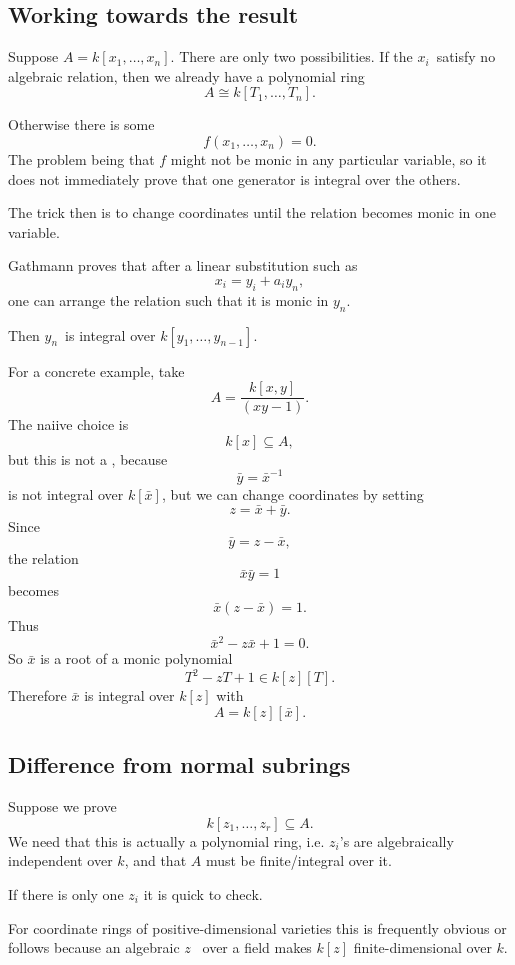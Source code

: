 \documentclass[11pt]{article}
\begin{document}
\subsection{Working towards the result}

Suppose $A = k[x_1,\ldots,x_n]$. There are only 
two possibilities. If the $x_i$ satisfy no 
algebraic relation, then we already have a polynomial ring 
\[
    A \cong k[T_1,\ldots,T_n]. 
\]

Otherwise there is some 
\[
    f(x_1,\ldots,x_n) = 0. 
\]
The problem being that $f$ might not be monic in 
any particular variable, so it does not immediately 
prove that one generator is integral over the others. 

The trick then is to change coordinates until the 
relation becomes monic in one variable. 

Gathmann proves that after a linear substitution such as 
\[
    x_i = y_i + a_iy_n, 
\]
one can arrange the relation such that it is monic in $y_n$. 

Then $y_n$ is integral over $k[y_1,\ldots,y_{n-1}]$. 

For a concrete example, take 
\[
    A = \frac{k[x,y]}{(xy - 1)}.
\]
The naiive choice is 
\[
    k[x] \subseteq A, 
\]
but this is not a , because 
\[
    \bar y = \bar x^{-1}
\]
is not integral over $k[\bar x]$, 
but we can change coordinates by setting 
\[
    z = \bar x + \bar y. 
\]
Since 
\[
    \bar y = z - \bar x, 
\]
the relation 
\[
    \bar x \bar y = 1
\]
becomes 
\[
    \bar x(z - \bar x) = 1. 
\]
Thus 
\[
    \bar x^2 - z \bar x + 1 = 0. 
\]
So $\bar x$ is a root of a monic polynomial 
\[
    T^2 - zT + 1 \in k[z][T].
\]
Therefore $\bar x$ is integral over $k[z]$ with 
\[
    A = k[z][\bar x]. 
\]

\subsection{Difference from normal subrings}
Suppose we prove 
\[
    k[z_1,\ldots,z_r] \subseteq A. 
\]
We need that this is actually a polynomial ring, i.e. 
$z_i$'s are algebraically independent over $k$, and that 
$A$ must be finite/integral over it. 

If there is only one $z_i$ it is quick to check.

For coordinate rings of positive-dimensional varieties this is 
frequently obvious or follows because an algebraic $z$ 
over a field makes $k[z]$ finite-dimensional over $k$. 
\end{document}
